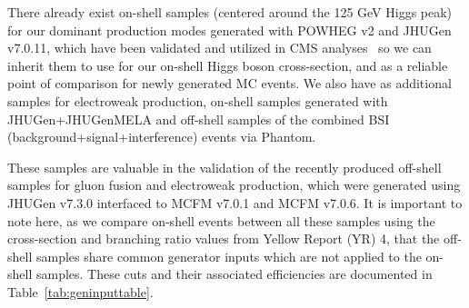 There already exist on-shell samples (centered around the 125 GeV Higgs peak) for our dominant production modes generated with POWHEG v2 and JHUGen v7.0.11, which have been validated and utilized in CMS analyses~\cite{Sirunyan:2019twz, Sirunyan:2021rug, Sirunyan:2765059} so we can inherit them to use for our on-shell Higgs boson cross-section, and as a reliable point of comparison for newly generated MC events. We also have as additional samples for electroweak production, on-shell samples generated with JHUGen+JHUGenMELA and off-shell samples of the combined BSI (background+signal+interference) events via Phantom.

These samples are valuable in the validation of the recently produced off-shell samples for gluon fusion and electroweak production, which were generated using JHUGen v7.3.0 interfaced to MCFM v7.0.1 and MCFM v7.0.6. It is important to note here, as we compare on-shell events between all these samples using the cross-section and branching ratio values from Yellow Report (YR) 4, that the off-shell samples share common generator inputs which are not applied to the on-shell samples. These cuts and their associated efficiencies are documented in Table~\ref{tab:geninputtable}.

